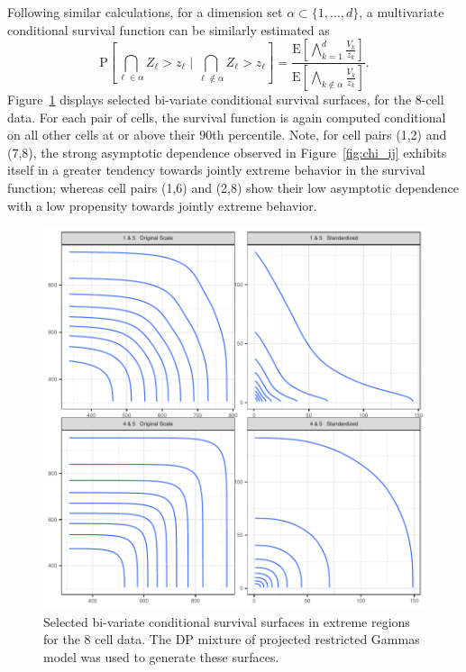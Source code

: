 Following similar calculations, for a dimension set $\alpha \subset \{1,\ldots, d\}$, a multivariate
  conditional survival function can be similarly estimated as
  \begin{equation}
    \label{eqn:condsurv2df}
    \text{P}\left[\bigcap_{\ell \in \alpha} Z_{\ell} > z_{\ell} \mid \bigcap_{\ell\not\in\alpha} Z_{\ell} > z_{\ell}\right] =
      \frac{\text{E}\left[\bigwedge_{k = 1}^d \frac{V_k}{z_k}\right]}{\text{E}\left[\bigwedge_{k \not\in\alpha}\frac{V_k}{z_k}\right]}.
  \end{equation}
  Figure~\ref{fig:condsurv2d} displays selected bi-variate conditional survival surfaces, for the 8-cell
  data.  For each pair of cells, the survival function is again computed conditional on  all other cells
  at or above their $90$th percentile.  Note, for cell pairs (1,2) and (7,8), the strong asymptotic dependence
  observed in Figure~\ref{fig:chi_ij} exhibits itself in a greater tendency towards jointly extreme
  behavior in the survival function; whereas cell pairs (1,6) and (2,8) show their low asymptotic
  dependence with a low propensity towards jointly extreme behavior.

\begin{figure}[t]
  \caption{
    Selected bi-variate conditional survival surfaces in extreme regions for the 8 cell data.
    The DP mixture of projected restricted Gammas model was used to generate these surfaces.
    \label{fig:condsurv2d}
    }
  \includegraphics{./images/condsurv_2d}
\end{figure}

